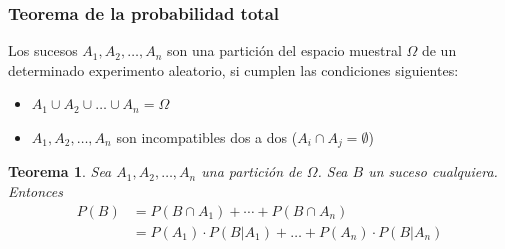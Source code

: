 \documentclass[handout]{beamer}\usepackage[]{graphicx}\usepackage[]{color}
\renewcommand{\emph}[1]{{\color{red}#1}}
\theoremstyle{plain}
\newtheorem{teorema}{Teorema}
\theoremstyle{definition}
\newcommand{\EM}{\Omega}
\begin{document}
\begin{frame}
\frametitle{Teorema de la probabilidad total}  

Los sucesos $A_1,A_2,\ldots, A_n$ son  una \emph{partición} del espacio muestral $\EM$ de un determinado experimento aleatorio, si cumplen las condiciones siguientes:
\begin{itemize}
\item $A_1\cup A_2\cup\ldots\cup A_n=\EM$
\item $A_1,A_2,\ldots,A_n$ son incompatibles dos a dos ($A_i\cap A_j=\emptyset$)

\end{itemize}

\begin{teorema}
Sea $A_1,A_2,\ldots,A_n$ una partición de $\EM$. Sea $B$ un suceso cualquiera. Entonces
{\small $$
\begin{array}{rl}
P(B)&= P(B\cap A_1)+\cdots +P(B\cap A_n)\\
& =P(A_1)\cdot P(B|A_1)+\ldots+P(A_n)\cdot P(B|A_n)
\end{array}
$$
}\end{teorema}

\end{frame}

%
%
%
%
%
%
\end{document}
